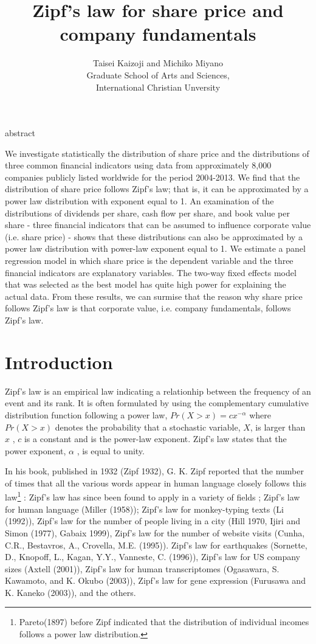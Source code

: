\documentclass[10pt,a4paper]{article}
\begin{document}
%
\title{Zipf's law for share price and company fundamentals}
\author {Taisei Kaizoji and Michiko Miyano \\ Graduate School of Arts and Sciences,\\ International Christian Unversity}
\maketitle
\begin{center}
abstract
\end{center}
We investigate statistically the distribution of share price and the distributions of three common financial indicators using data from approximately 8,000 companies publicly listed worldwide for the period 2004-2013. We find that the distribution of share price follows Zipf's law; that is, it can be approximated by a power law distribution with exponent equal to 1. An examination of the distributions of dividends per share, cash flow per share, and book value per share - three financial indicators that can be assumed to influence corporate value (i.e. share price) - shows that these distributions can also be approximated by a power law distribution with power-law exponent equal to 1. We estimate a panel regression model in which share price is the dependent variable and the three financial indicators are explanatory variables. The two-way fixed effects model that was selected as the best model has quite high power for explaining the actual data. From these results, we can surmise that the reason why share price follows Zipf's law is that corporate value, i.e. company fundamentals, follows Zipf's law.

\section{Introduction}
Zipf's law is an empirical law indicating a relationhip between the frequency of an event and its rank. It is often formulated by using the complementary cumulative distribution function following a power law,  $Pr(X>x)=cx^{-\alpha}$ where $Pr(X>x)$  denotes the probability that a stochastic variable, $X$, is larger than  $x$ , $c$   is a constant and  is the power-law exponent. Zipf's law states that the power exponent, $\alpha$ , is equal to unity. 

In his book, published in 1932 (Zipf 1932), G. K. Zipf reported that the number of times that all the various words appear in human language closely follows this law\footnote{Pareto(1897) before Zipf indicated that the distribution of individual incomes follows a power law distribution.} : Zipf's law has since been found to apply in a variety of fields ; Zipf's law for human language (Miller (1958)); Zipf's law for monkey-typing texts (Li (1992)), Zipf's law for the number of people living in a city (Hill 1970, Ijiri and Simon (1977), Gabaix 1999), Zipf's law for the number of website visits (Cunha, C.R., Bestavros, A., Crovella, M.E. (1995)). Zipf's law for earthquakes (Sornette, D., Knopoff, L., Kagan, Y.Y., Vanneste, C. (1996)), Zipf's law for US company sizes (Axtell (2001)), Zipf's law for  human transcriptomes (Ogasawara, S. Kawamoto, and K. Okubo (2003)), Zipf's law for gene expression (Furusawa and K. Kaneko (2003)), and the others. 
\end{document}
